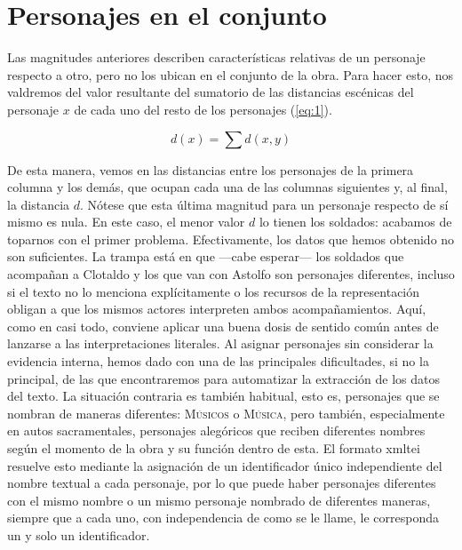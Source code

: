 \section*{Personajes en el conjunto}

Las magnitudes anteriores describen características relativas de un personaje respecto a otro, pero no los ubican en el conjunto de la obra. Para hacer esto, nos valdremos del valor resultante del sumatorio de las distancias escénicas del personaje $x$ de cada uno del resto de los personajes (\ref{eq:1}).

\begin{equation}\label{eq:1}
	d(x) = \sum{d(x,y)}
\end{equation}

De esta manera, vemos en  las distancias entre los personajes de la primera columna y los demás, que ocupan cada una de las columnas siguientes y, al final, la distancia $d$. Nótese que esta última magnitud para un personaje respecto de sí mismo es nula. En este caso, el menor valor $d$ lo tienen los soldados: acabamos de toparnos con el primer problema. Efectivamente, los datos que hemos obtenido no son suficientes. La trampa está en que —\nolinebreak cabe esperar\nolinebreak— los soldados que acompañan a Clotaldo y los que van con Astolfo son personajes diferentes, incluso si el texto no lo menciona explícitamente o los recursos de la representación obligan a que los mismos actores interpreten ambos acompañamientos. Aquí, como en casi todo, conviene aplicar una buena dosis de sentido común antes de lanzarse a las interpretaciones literales. Al asignar personajes sin considerar la evidencia interna, hemos dado con una de las principales dificultades, si no la principal, de las que encontraremos para automatizar la extracción de los datos del texto. La situación contraria es también habitual, esto es, personajes que se nombran de maneras diferentes: \textsc{Músicos} o \textsc{Música}, pero también, especialmente en autos sacramentales, personajes alegóricos que reciben diferentes nombres según el momento de la obra y su función dentro de esta. El formato \ac{xmltei} resuelve esto mediante la asignación de un identificador único independiente del nombre textual a cada personaje, por lo que puede haber personajes diferentes con el mismo nombre o un mismo personaje nombrado de diferentes maneras, siempre que a cada uno, con independencia de como se le llame, le corresponda un y solo un identificador. 


